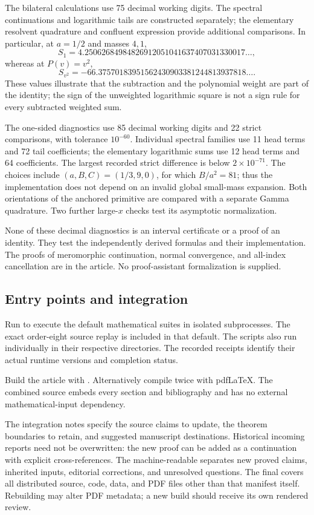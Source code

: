 The bilateral calculations use 75 decimal working digits.  The
spectral continuations and logarithmic tails are constructed separately;
the elementary resolvent quadrature and confluent expression provide
additional comparisons.  In particular, at $a=1/2$ and masses $4,1$,
\[
 S_1=4.25062684984826912051041637407031330017\ldots,
\]
whereas at $P(v)=v^2$,
\[
 S_{v^2}=-66.37570183951562430903381244813937818\ldots.
\]
These values illustrate that the subtraction and the polynomial weight
are part of the identity; the sign of the unweighted logarithmic square
is not a sign rule for every subtracted weighted sum.

The one-sided diagnostics use 85 decimal working digits and 22 strict
comparisons, with tolerance $10^{-60}$.  Individual spectral families
use 11 head terms and 72 tail coefficients; the elementary logarithmic
sums use 12 head terms and 64 coefficients.  The largest recorded
strict difference is below $2\times10^{-71}$.  The choices include
$(a,B,C)=(1/3,9,0)$, for which $B/a^2=81$; thus the implementation
does not depend on an invalid global small-mass expansion.  Both
orientations of the anchored primitive are compared with a separate
Gamma quadrature.  Two further large-$x$ checks test its asymptotic
normalization.

None of these decimal diagnostics is an interval certificate or a proof
of an identity.  They test the independently derived formulas and
their implementation.  The proofs of meromorphic continuation,
normal convergence, and all-index cancellation are in the article.
No proof-assistant formalization is supplied.

\subsection{Entry points and integration}

Run  to execute the default
mathematical suites in isolated subprocesses.  The exact order-eight
source replay is included in that default.  The scripts also run
individually in their respective directories.  The recorded receipts
identify their actual runtime versions and completion status.

Build the article with
.
Alternatively compile  twice with
pdf\LaTeX{}.  The combined source embeds every section and bibliography
and has no external mathematical-input dependency.

The integration notes specify the source claims to update, the theorem
boundaries to retain, and suggested manuscript destinations.  Historical
incoming reports need not be overwritten: the new proof can be added
as a continuation with explicit cross-references.  The machine-readable
 separates new proved claims, inherited inputs,
editorial corrections, and unresolved questions.  The final
 covers all distributed source, code, data, and PDF
files other than that manifest itself.  Rebuilding may alter PDF
metadata; a new build should receive its own rendered review.

